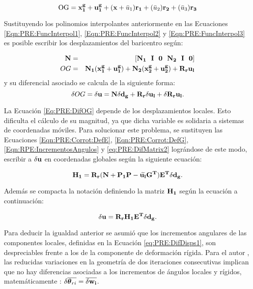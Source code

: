 \begin{equation}\label{Eqn:PRE:DispsOG}
 	\text{OG} = \bf{x}_1^g+\bf{u}_1^g + (x+\text{$\bar{u}_1$}) \bf{r_1} + (\text{$\bar{u}_2$})\bf{r_2}+ (\text{$\bar{u}_3$})\bf{r_3}
\end{equation}

Sustituyendo los polinomios interpolantes anteriormente en las Ecuaciones \eqref{Eqn:PRE:FuncInterpol1}, \eqref{Eqn:PRE:FuncInterpol2} y \eqref{Eqn:PRE:FuncInterpol3} es posible escribir los desplazamientos del baricentro según: 

\begin{eqnarray}
	\bf{N}&=&[\bf{N_1}~~ \bf{I}~~ \bf{0}~~ \bf{N_2}~~ \bf{I}~~ \bf{0}]\\
	OG    &=& \bf{N_1}(\bf{x}_1^g+\bf{u}_1^g)+\bf{N_2}(\bf{x}_2^g+\bf{u}_2^g)+ \bf{R}_r \bf{u}_l
\end{eqnarray}
y su diferencial asociado se calcula de la siguiente forma:
\begin{equation}
	\label{Eq:PRE:DifOG}
	\delta OG = \delta \bf{u} = \bf{N}\delta\bf{d}_g+\bf{R}_r \delta\bf{u}_l + \delta \bf{R}_r \bf{u}_l.
\end{equation}

 La Ecuación \eqref{Eq:PRE:DifOG} depende de los desplazamientos locales. Esto dificulta el cálculo de su magnitud, ya que dicha variable es solidaria a sistemas de coordenadas móviles. Para solucionar este problema, se sustituyen las Ecuaciones \eqref{Eqn:PRE:Corrot:DefE}, \eqref{Eqn:PRE:Corrot:DefG}, \eqref{Eqn:RPE:IncrementosAngulos} y \eqref{eq:PRE:DifMatrix2} lográndose de este modo, escribir a $ \delta \bf{u}$ en coordenadas globales según la siguiente ecuación:

 \begin{equation}
	 \bf{H}_1 = \bf{R}_r(\bf{N}+\bf{P}_1\bf{P}-\widetilde{\bf{u}_l}\bf{G}^T)\bf{E}^T \delta \bf{d}_g.
 \end{equation}

 Además se compacta la notación definiendo la matriz $\bf{H}_1$ según la ecuación a continuación:
 
 \begin{equation}
 	\label{Eqn:PRE:DifUDefH1}
	\delta \bf{u}= \bf{R}_r \bf{H}_1 \bf{E}^T \delta \bf{d}_g.
 \end{equation}

 Para deducir la igualdad anterior se asumió que los incrementos angulares de las componentes locales, definidas en la Ecuación \eqref{eq:PRE:DifDisps1}, son despreciables frente a los de la componente de deformación rígida. Para el autor \cite{Le2014}, las reducidas variaciones en la geometría de dos iteraciones consecutivas implican que no hay diferencias asociadas a los incrementos de ángulos locales y rígidos, matemáticamente : $\delta \overline{\boldsymbol{\theta}_{ri}}= \overline{\delta \bf{w}_i}$.

